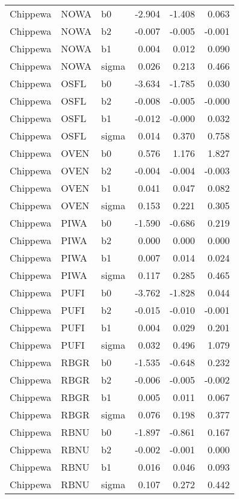 \begin{table}[ht]
\begin{center}
\begin{tabular}{lllrrr}
  Chippewa & NOWA & b0 & -2.904 & -1.408 & 0.063 \\ 
  Chippewa & NOWA & b2 & -0.007 & -0.005 & -0.001 \\ 
  Chippewa & NOWA & b1 & 0.004 & 0.012 & 0.090 \\ 
  Chippewa & NOWA & sigma & 0.026 & 0.213 & 0.466 \\ 
  Chippewa & OSFL & b0 & -3.634 & -1.785 & 0.030 \\ 
  Chippewa & OSFL & b2 & -0.008 & -0.005 & -0.000 \\ 
  Chippewa & OSFL & b1 & -0.012 & -0.000 & 0.032 \\ 
  Chippewa & OSFL & sigma & 0.014 & 0.370 & 0.758 \\ 
  Chippewa & OVEN & b0 & 0.576 & 1.176 & 1.827 \\ 
  Chippewa & OVEN & b2 & -0.004 & -0.004 & -0.003 \\ 
  Chippewa & OVEN & b1 & 0.041 & 0.047 & 0.082 \\ 
  Chippewa & OVEN & sigma & 0.153 & 0.221 & 0.305 \\ 
  Chippewa & PIWA & b0 & -1.590 & -0.686 & 0.219 \\ 
  Chippewa & PIWA & b2 & 0.000 & 0.000 & 0.000 \\ 
  Chippewa & PIWA & b1 & 0.007 & 0.014 & 0.024 \\ 
  Chippewa & PIWA & sigma & 0.117 & 0.285 & 0.465 \\ 
  Chippewa & PUFI & b0 & -3.762 & -1.828 & 0.044 \\ 
  Chippewa & PUFI & b2 & -0.015 & -0.010 & -0.001 \\ 
  Chippewa & PUFI & b1 & 0.004 & 0.029 & 0.201 \\ 
  Chippewa & PUFI & sigma & 0.032 & 0.496 & 1.079 \\ 
  Chippewa & RBGR & b0 & -1.535 & -0.648 & 0.232 \\ 
  Chippewa & RBGR & b2 & -0.006 & -0.005 & -0.002 \\ 
  Chippewa & RBGR & b1 & 0.005 & 0.011 & 0.067 \\ 
  Chippewa & RBGR & sigma & 0.076 & 0.198 & 0.377 \\ 
  Chippewa & RBNU & b0 & -1.897 & -0.861 & 0.167 \\ 
  Chippewa & RBNU & b2 & -0.002 & -0.001 & 0.000 \\ 
  Chippewa & RBNU & b1 & 0.016 & 0.046 & 0.093 \\ 
  Chippewa & RBNU & sigma & 0.107 & 0.272 & 0.442 \\ 

\end{tabular}
\end{center}
\end{table}

